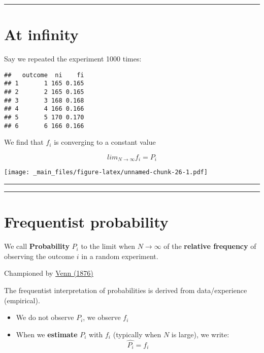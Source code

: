 \documentclass[
]{book}
\providecommand{\tightlist}{%
  \setlength{\itemsep}{0pt}\setlength{\parskip}{0pt}}
\begin{document}
\begin{center}\rule{0.5\linewidth}{0.5pt}\end{center}

\hypertarget{at-infinity}{%
\section{At infinity}\label{at-infinity}}

Say we repeated the experiment 1000 times:

\begin{verbatim}
##   outcome  ni    fi
## 1       1 165 0.165
## 2       2 165 0.165
## 3       3 168 0.168
## 4       4 166 0.166
## 5       5 170 0.170
## 6       6 166 0.166
\end{verbatim}

We find that \(f_i\) is converging to a constant value

\[lim_{N\rightarrow \infty} f_i = P_i\]

\texttt{[image: \_main\_files/figure-latex/unnamed-chunk-26-1.pdf]}

\begin{center}\rule{0.5\linewidth}{0.5pt}\end{center}

\begin{center}\rule{0.5\linewidth}{0.5pt}\end{center}

\hypertarget{frequentist-probability}{%
\section{Frequentist probability}\label{frequentist-probability}}

We call \textbf{Probability} \(P_i\) to the limit when \(N \rightarrow \infty\) of the \textbf{relative frequency} of observing the outcome \(i\) in a random experiment.

Championed by \href{https://plato.stanford.edu/entries/probability-interpret/\#ClaPro}{Venn (1876)}

The frequentist interpretation of probabilities is derived from data/experience (empirical).

\begin{itemize}
\tightlist
\item
  We do not observe \(P_i\), we observe \(f_i\)
\item
  When we \textbf{estimate} \(P_i\) with \(f_i\) (typically when \(N\) is large), we write: \[\hat{P_i}=f_i\]
\end{itemize}
\end{document}

